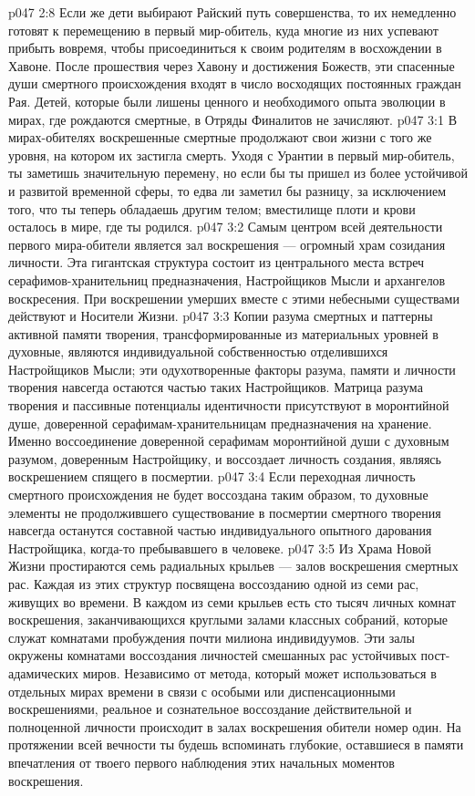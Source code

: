 \vs p047 2:8 Если же дети выбирают Райский путь совершенства, то их немедленно готовят к перемещению в первый мир\hyp{}обитель, куда многие из них успевают прибыть вовремя, чтобы присоединиться к своим родителям в восхождении в Хавоне. После прошествия через Хавону и достижения Божеств, эти спасенные души смертного происхождения входят в число восходящих постоянных граждан Рая. Детей, которые были лишены ценного и необходимого опыта эволюции в мирах, где рождаются смертные, в Отряды Финалитов не зачисляют.
\vs p047 3:1 В мирах\hyp{}обителях воскрешенные смертные продолжают свои жизни с того же уровня, на котором их застигла смерть. Уходя с Урантии в первый мир\hyp{}обитель, ты заметишь значительную перемену, но если бы ты пришел из более устойчивой и развитой временной сферы, то едва ли заметил бы разницу, за исключением того, что ты теперь обладаешь другим телом; вместилище плоти и крови осталось в мире, где ты родился.
\vs p047 3:2 Самым центром всей деятельности первого мира\hyp{}обители является зал воскрешения --- огромный храм созидания личности. Эта гигантская структура состоит из центрального места встреч серафимов\hyp{}хранительниц предназначения, Настройщиков Мысли и архангелов воскресения. При воскрешении умерших вместе с этими небесными существами действуют и Носители Жизни.
\vs p047 3:3 Копии разума смертных и паттерны активной памяти творения, трансформированные из материальных уровней в духовные, являются индивидуальной собственностью отделившихся Настройщиков Мысли; эти одухотворенные факторы разума, памяти и личности творения навсегда остаются частью таких Настройщиков. Матрица разума творения и пассивные потенциалы идентичности присутствуют в моронтийной душе, доверенной серафимам\hyp{}хранительницам предназначения на хранение. Именно воссоединение доверенной серафимам моронтийной души с духовным разумом, доверенным Настройщику, и воссоздает личность создания, являясь воскрешением спящего в посмертии.
\vs p047 3:4 Если переходная личность смертного происхождения не будет воссоздана таким образом, то духовные элементы не продолжившего существование в посмертии смертного творения навсегда останутся составной частью индивидуального опытного дарования Настройщика, когда\hyp{}то пребывавшего в человеке.
\vs p047 3:5 Из Храма Новой Жизни простираются семь радиальных крыльев --- залов воскрешения смертных рас. Каждая из этих структур посвящена воссозданию одной из семи рас, живущих во времени. В каждом из семи крыльев есть сто тысяч личных комнат воскрешения, заканчивающихся круглыми залами классных собраний, которые служат комнатами пробуждения почти милиона индивидуумов. Эти залы окружены комнатами воссоздания личностей смешанных рас устойчивых пост\hyp{}адамических миров. Независимо от метода, который может использоваться в отдельных мирах времени в связи с особыми или диспенсационными воскрешениями, реальное и сознательное воссоздание действительной и полноценной личности происходит в залах воскрешения обители номер один. На протяжении всей вечности ты будешь вспоминать глубокие, оставшиеся в памяти впечатления от твоего первого наблюдения этих начальных моментов воскрешения.

